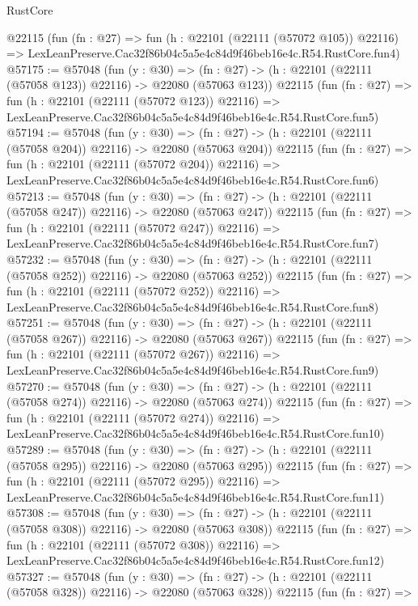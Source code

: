 \begin{lexlean}{RustCore}
\begin{coremodule}
    @22115
    (fun (fn : @27) =>
    fun (h : @22101 (@22111 (@57072 @105)) @22116) =>
    LexLeanPreserve.Cac32f86b04c5a5e4c84d9f46beb16e4c.R54.RustCore.fun4)
@57175 := @57048
    (fun (y : @30) =>
    (fn : @27) -> (h : @22101 (@22111 (@57058 @123)) @22116) -> @22080 (@57063 @123))
    @22115
    (fun (fn : @27) =>
    fun (h : @22101 (@22111 (@57072 @123)) @22116) =>
    LexLeanPreserve.Cac32f86b04c5a5e4c84d9f46beb16e4c.R54.RustCore.fun5)
@57194 := @57048
    (fun (y : @30) =>
    (fn : @27) -> (h : @22101 (@22111 (@57058 @204)) @22116) -> @22080 (@57063 @204))
    @22115
    (fun (fn : @27) =>
    fun (h : @22101 (@22111 (@57072 @204)) @22116) =>
    LexLeanPreserve.Cac32f86b04c5a5e4c84d9f46beb16e4c.R54.RustCore.fun6)
@57213 := @57048
    (fun (y : @30) =>
    (fn : @27) -> (h : @22101 (@22111 (@57058 @247)) @22116) -> @22080 (@57063 @247))
    @22115
    (fun (fn : @27) =>
    fun (h : @22101 (@22111 (@57072 @247)) @22116) =>
    LexLeanPreserve.Cac32f86b04c5a5e4c84d9f46beb16e4c.R54.RustCore.fun7)
@57232 := @57048
    (fun (y : @30) =>
    (fn : @27) -> (h : @22101 (@22111 (@57058 @252)) @22116) -> @22080 (@57063 @252))
    @22115
    (fun (fn : @27) =>
    fun (h : @22101 (@22111 (@57072 @252)) @22116) =>
    LexLeanPreserve.Cac32f86b04c5a5e4c84d9f46beb16e4c.R54.RustCore.fun8)
@57251 := @57048
    (fun (y : @30) =>
    (fn : @27) -> (h : @22101 (@22111 (@57058 @267)) @22116) -> @22080 (@57063 @267))
    @22115
    (fun (fn : @27) =>
    fun (h : @22101 (@22111 (@57072 @267)) @22116) =>
    LexLeanPreserve.Cac32f86b04c5a5e4c84d9f46beb16e4c.R54.RustCore.fun9)
@57270 := @57048
    (fun (y : @30) =>
    (fn : @27) -> (h : @22101 (@22111 (@57058 @274)) @22116) -> @22080 (@57063 @274))
    @22115
    (fun (fn : @27) =>
    fun (h : @22101 (@22111 (@57072 @274)) @22116) =>
    LexLeanPreserve.Cac32f86b04c5a5e4c84d9f46beb16e4c.R54.RustCore.fun10)
@57289 := @57048
    (fun (y : @30) =>
    (fn : @27) -> (h : @22101 (@22111 (@57058 @295)) @22116) -> @22080 (@57063 @295))
    @22115
    (fun (fn : @27) =>
    fun (h : @22101 (@22111 (@57072 @295)) @22116) =>
    LexLeanPreserve.Cac32f86b04c5a5e4c84d9f46beb16e4c.R54.RustCore.fun11)
@57308 := @57048
    (fun (y : @30) =>
    (fn : @27) -> (h : @22101 (@22111 (@57058 @308)) @22116) -> @22080 (@57063 @308))
    @22115
    (fun (fn : @27) =>
    fun (h : @22101 (@22111 (@57072 @308)) @22116) =>
    LexLeanPreserve.Cac32f86b04c5a5e4c84d9f46beb16e4c.R54.RustCore.fun12)
@57327 := @57048
    (fun (y : @30) =>
    (fn : @27) -> (h : @22101 (@22111 (@57058 @328)) @22116) -> @22080 (@57063 @328))
    @22115
    (fun (fn : @27) =>

\end{coremodule}
\end{lexlean}
